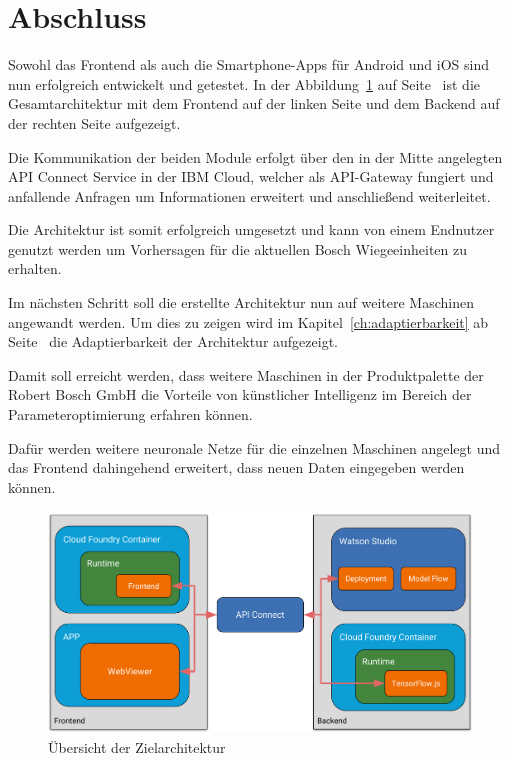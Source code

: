 \section{Abschluss}
Sowohl das Frontend als auch die Smartphone-Apps für Android und iOS sind nun erfolgreich entwickelt und getestet. In
der Abbildung~\ref{fig:umsetzung_zielarchitektur_4} auf Seite~\pageref{fig:umsetzung_zielarchitektur_4} ist die
Gesamtarchitektur mit dem Frontend auf der linken Seite und dem Backend auf der rechten Seite aufgezeigt.

Die Kommunikation der beiden Module erfolgt über den in der Mitte angelegten API Connect Service in der IBM Cloud,
welcher als API-Gateway fungiert und anfallende Anfragen um Informationen erweitert und anschließend weiterleitet.

Die Architektur ist somit erfolgreich umgesetzt und kann von einem Endnutzer genutzt werden um Vorhersagen für die
aktuellen Bosch Wiegeeinheiten zu erhalten.

Im nächsten Schritt soll die erstellte Architektur nun auf weitere Maschinen angewandt werden. Um dies zu zeigen wird
im Kapitel~\ref{ch:adaptierbarkeit} ab Seite~\pageref{ch:adaptierbarkeit} die Adaptierbarkeit der Architektur
aufgezeigt.

Damit soll erreicht werden, dass weitere Maschinen in der Produktpalette der Robert Bosch GmbH die Vorteile von
künstlicher Intelligenz im Bereich der Parameteroptimierung erfahren können.

Dafür werden weitere neuronale Netze für die einzelnen Maschinen angelegt und das Frontend dahingehend erweitert,
dass neuen Daten eingegeben werden können.

\begin{figure}[h]
    \centering
    \includegraphics[width=\textwidth]{images/kapitel_4/architektur_uebersicht.pdf}
    \caption{Übersicht der Zielarchitektur}
    \label{fig:umsetzung_zielarchitektur_4}
\end{figure}